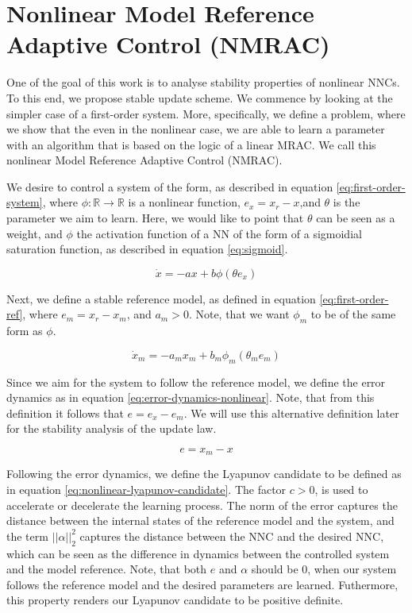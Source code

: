 \section{Nonlinear Model Reference Adaptive Control (NMRAC)}
\label{sec:MRAC-Nonlinear-SISO}


One of the goal of this work is to analyse stability properties of nonlinear NNCs. To this end, we propose stable update scheme. We commence by looking at the simpler case of a first-order system. More, specifically, we define a problem, where we show that the even in the nonlinear case, we are able to learn a parameter with an algorithm that is based on the logic of a linear MRAC. We call this nonlinear Model Reference Adaptive Control (NMRAC).

We desire to control a system of the form, as described in equation \eqref{eq:first-order-system}, where $\phi: \mathbb{R}\rightarrow\mathbb{R}$ is a nonlinear function, $e_x=x_r - x$,and $\theta$ is the parameter we aim to learn. Here, we would like to point that $\theta$ can be seen as a weight, and $\phi$ the activation function of a NN of the form of a sigmoidial saturation function, as described in equation \eqref{eq:sigmoid}.

\begin{equation}
    \dot x = -ax + b\phi(\theta e_x)
    \label{eq:first-order-system}
\end{equation}

Next, we define a stable reference model, as defined in equation \eqref{eq:first-order-ref}, where $e_m=x_r - x_m$, and $a_m>0$. Note, that we want $\phi_m$ to be of the same form as $\phi$.

\begin{equation}
    \dot x_m = -a_mx_m + b_m\phi_m(\theta_m e_m)
    \label{eq:first-order-ref}
\end{equation}

Since we aim for the system to follow the reference model, we define the error dynamics as in equation \eqref{eq:error-dynamics-nonlinear}. Note, that from this definition it follows that $e=e_x-e_m$. We will use this alternative definition later for the stability analysis of the update law.

\begin{equation}
    e=x_m-x
    \label{eq:error-dynamics-nonlinear}
\end{equation}

Following the error dynamics, we define the Lyapunov candidate to be defined as in equation \eqref{eq:nonlinear-lyapunov-candidate}. The factor $c>0$, is used to accelerate or decelerate the learning process. The norm of the error captures the distance between the internal states of the reference model and the system, and the term $||\alpha||_2^2$ captures the distance between the NNC and the desired NNC, which can be seen as the difference in dynamics between the controlled system and the model reference. Note, that both $e$ and $\alpha$ should be $0$, when our system follows the reference model and the desired parameters are learned. Futhermore, this property renders our Lyapunov candidate to be positive definite.

